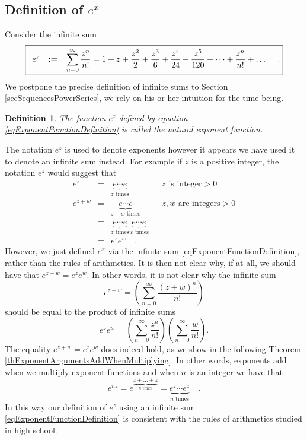 \documentclass[12pt]{book}
\newcommand{\eqdef}{\textbf{:=}}
\newtheorem{definition}[theorem]{Definition}
\begin{document}
\subsection{Definition of $e^x$}
Consider the infinite sum
\begin{equation}\boxed{\label{eqExponentFunctionDefinition}
\begin{array}{rcl}
\displaystyle e^{z}&\eqdef &\displaystyle \sum_{n=0}^{\infty} \frac{z^n}{n!} = 1+z+\frac{z^{2}}{2}+\frac{z^3}{6}+\frac{z^4}{24}+\frac{z^5}{120}+\dots+\frac{z^n}{n!}+\dots\\
\end{array} \quad .
}
\end{equation}
We postpone the precise definition of infinite sums to Section \ref{secSequencesPowerSeries}, we rely on his or her intuition for the time being.
\begin{definition}\label{defNaturalExponent}
 The function $e^z$ defined by equation \eqref{eqExponentFunctionDefinition} is called the natural exponent function.
\end{definition}
The notation $e^z$ is used to denote exponents however it appears we have used it to denote an infinite sum instead. For example if $z$ is a positive integer, the notation $e^z$ would suggest that 
\[
\begin{array}{rcll|l}
e^{z}&=& \underbrace{e\cdots e}_{z \text{ times} } && z\text{ is integer}>0\\
e^{z+w}&=&\underbrace{e \cdots e}_{z+w \text{ times} }&& z,w\text{ are integers}>0\\
&=&\underbrace{e\cdots  e}_{z \text{ times} }\underbrace{e\cdots  e}_{w \text{ times} }\\
&=& e^z e^w\quad .
\end{array}
\]
However, we just defined $e^x$ via the infinite sum \eqref{eqExponentFunctionDefinition}, rather than the rules of arithmetics. It is then not clear why, if at all, we should have that $e^{z+w}=e^{z}e^{w}$. In other words, it is not clear why the infinite sum
\[
e^{z+w} =\left(\sum\limits_{n=0}^{\infty} \frac{(z+w)^n}{n!}\right)
\]
should be equal to the product of infinite sums
\[
e^{z} e^w=\left(\sum\limits_{n=0}^{\infty} \frac{z^n}{n!}\right)\left(\sum\limits_{n=0}^{\infty} \frac{w}{n!} \right) .
\]
The equality $e^{z+w}= e^{z}e^{w}$ does indeed hold, as we show in the following Theorem \ref{thExponentArgumentsAddWhenMultiplying}. In other words, exponents add when we multiply exponent functions and when $n$ is an integer we have that
\begin{equation}\label{eqExponentToIntegerPowerRespectsArithmetics}
e^{n z}= e^{\underbrace{z+\dots +z}_{n\text{ times}} }=\underbrace{ e^{z}\cdots  e^{z}}_{n \text{ times}}  \quad .
\end{equation}
In this way our definition of  $e^{z}$ using an infinite sum \eqref{eqExponentFunctionDefinition} is consistent with the rules of arithmetics studied in high school.
\end{document}
